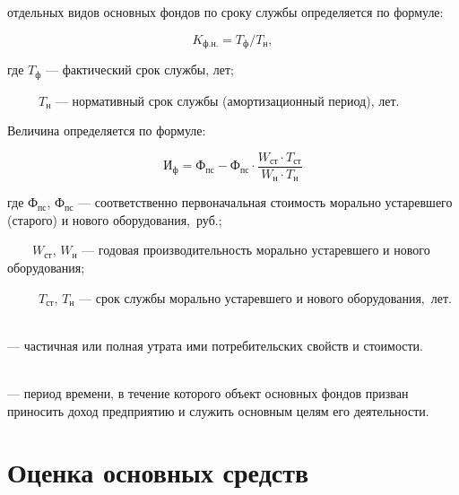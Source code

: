 \begin{tcolorbox}
 отдельных видов основных фондов по сроку
службы определяется по формуле:

\begin{equation}
    K_{\text{ф.н.}} = T_{\text{ф}}/T_{\text{н}},
\end{equation}

где $T_{\text{ф}}$ --- фактический срок службы, лет;

~~~~~$T_{\text{н}}$ --- нормативный срок службы (амортизационный период), лет.
\end{tcolorbox}

\begin{tcolorbox}
Величина  определяется по формуле:

\begin{equation}
    \text{И}_{\text{ф}} = \text{Ф}_{\text{пс}} - \text{Ф}_{\text{пс}} \cdot
    \frac{W_{\text{ст}} \cdot T_{\text{ст}}}{W_{\text{н}} \cdot T_{\text{н}}}
\end{equation}

где $\text{Ф}_{\text{пс}}$, $\text{Ф}_{\text{пс}}$ --- соответственно
первоначальная стоимость морально устаревшего (старого) и нового
оборудования,~руб.;

~~~~$W_{\text{ст}}$, $W_{\text{н}}$ --- годовая производительность морально
устаревшего и нового оборудования;

~~~~~$T_{\text{ст}}$, $T_{\text{н}}$ --- срок службы морально устаревшего и нового
оборудования,~лет.
\end{tcolorbox}

\begin{definition}
    \normalfont
    ~\\
     --- частичная или полная утрата ими
    потребительских свойств и стоимости.
\end{definition}

\begin{definition}
    \normalfont
    ~\\
     --- период времени, в
    течение которого объект основных фондов призван приносить доход предприятию
    и служить основным целям его деятельности.
\end{definition}


\section{Оценка основных средств}

